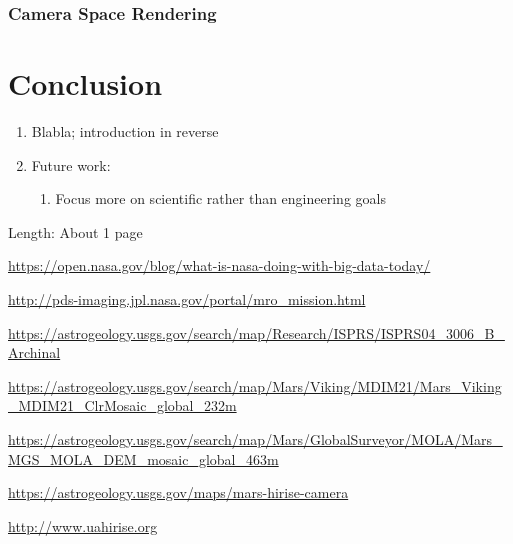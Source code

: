 \documentclass[journal]{vgtc}                %
\begin{document}
\subsubsection{Camera Space Rendering}

\section{Conclusion} \label{sec:system}
\begin{enumerate}
  \item Blabla; introduction in reverse
  \item Future work:
  \begin{enumerate}
    \item Focus more on scientific rather than engineering goals
  \end{enumerate}
\end{enumerate}
Length: About 1 page


%

%
%
%



\begin{thebibliography}{99}

\url{https://open.nasa.gov/blog/what-is-nasa-doing-with-big-data-today/}

\url{http://pds-imaging.jpl.nasa.gov/portal/mro_mission.html}

\url{https://astrogeology.usgs.gov/search/map/Research/ISPRS/ISPRS04_3006_B_Archinal}

\url{https://astrogeology.usgs.gov/search/map/Mars/Viking/MDIM21/Mars_Viking_MDIM21_ClrMosaic_global_232m}

\url{https://astrogeology.usgs.gov/search/map/Mars/GlobalSurveyor/MOLA/Mars_MGS_MOLA_DEM_mosaic_global_463m}

\url{https://astrogeology.usgs.gov/maps/mars-hirise-camera}

\url{http://www.uahirise.org}

\end{thebibliography}
\end{document}
